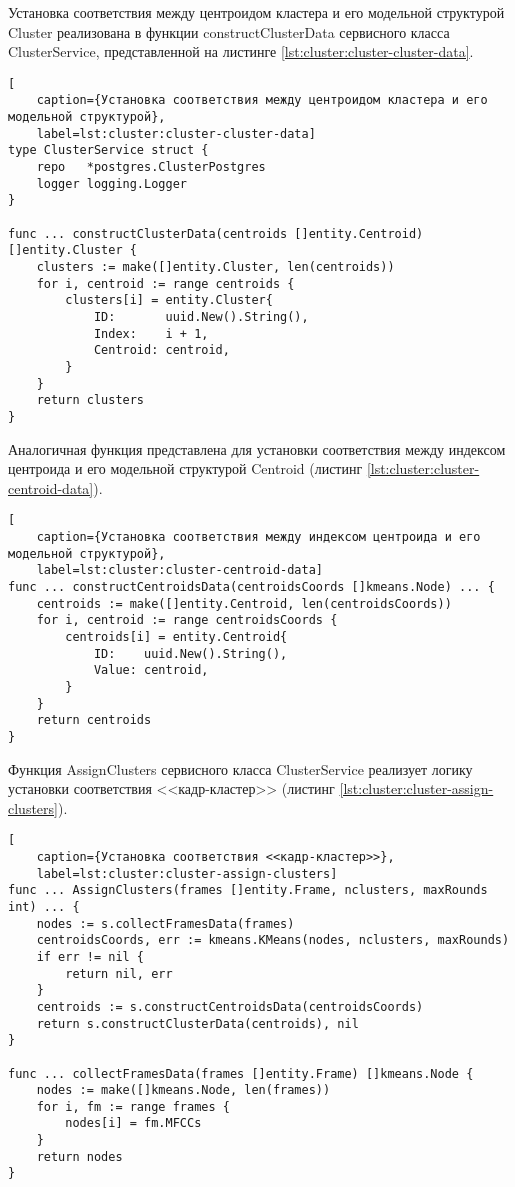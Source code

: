 Установка соответствия между центроидом кластера и его модельной структурой Cluster реализована в функции constructClusterData сервисного класса ClusterService, представленной на листинге \ref{lst:cluster:cluster-cluster-data}.
\begin{lstlisting}[
	caption={Установка соответствия между центроидом кластера и его модельной структурой},
	label=lst:cluster:cluster-cluster-data]
type ClusterService struct {
	repo   *postgres.ClusterPostgres
	logger logging.Logger
}

func ... constructClusterData(centroids []entity.Centroid) []entity.Cluster {
    clusters := make([]entity.Cluster, len(centroids))
    for i, centroid := range centroids {
        clusters[i] = entity.Cluster{
            ID:       uuid.New().String(),
            Index:    i + 1,
            Centroid: centroid,
        }
    }
    return clusters
}
\end{lstlisting}
Аналогичная функция представлена для установки соответствия между индексом центроида и его модельной структурой Centroid (листинг \ref{lst:cluster:cluster-centroid-data}).
\begin{lstlisting}[
	caption={Установка соответствия между индексом центроида и его модельной структурой},
	label=lst:cluster:cluster-centroid-data]
func ... constructCentroidsData(centroidsCoords []kmeans.Node) ... {
    centroids := make([]entity.Centroid, len(centroidsCoords))
    for i, centroid := range centroidsCoords {
        centroids[i] = entity.Centroid{
            ID:    uuid.New().String(),
            Value: centroid,
        }
    }
    return centroids
}
\end{lstlisting}
Функция AssignClusters сервисного класса ClusterService реализует логику установки соответствия <<кадр-кластер>> (листинг \ref{lst:cluster:cluster-assign-clusters}).
\begin{lstlisting}[
	caption={Установка соответствия <<кадр-кластер>>},
	label=lst:cluster:cluster-assign-clusters]
func ... AssignClusters(frames []entity.Frame, nclusters, maxRounds int) ... {
    nodes := s.collectFramesData(frames)
    centroidsCoords, err := kmeans.KMeans(nodes, nclusters, maxRounds)
    if err != nil {
        return nil, err
    }
    centroids := s.constructCentroidsData(centroidsCoords)
    return s.constructClusterData(centroids), nil
}

func ... collectFramesData(frames []entity.Frame) []kmeans.Node {
    nodes := make([]kmeans.Node, len(frames))
    for i, fm := range frames {
        nodes[i] = fm.MFCCs
    }
    return nodes
}
\end{lstlisting}

